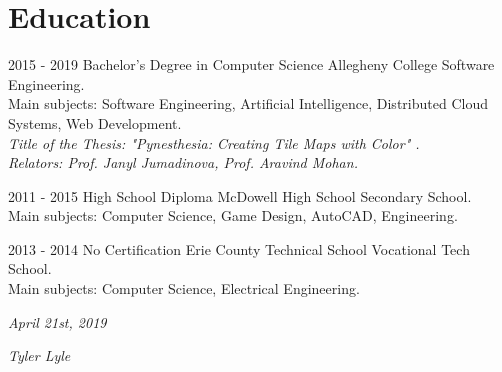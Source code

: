 \documentclass[]{friggeri-cv}
\begin{document}
\section{Education}
\begin{entrylist}
  \entry
    {2015 - 2019}
    {Bachelor's Degree in Computer Science}
    {Allegheny College}
    {Software Engineering.\\
    Main subjects: Software Engineering, Artificial Intelligence, Distributed Cloud Systems, Web Development.\\
    \emph{Title of the Thesis: "Pynesthesia: Creating Tile Maps with Color"      .}\\
    \emph{Relators: Prof. Janyl Jumadinova, Prof. Aravind Mohan.}\\}

  \entry
    {2011 - 2015}
    {High School Diploma}
    {McDowell High School}
    {Secondary School.\\
    Main subjects: Computer Science, Game Design, AutoCAD, Engineering.\\}

  \entry
	{2013 - 2014}
	{No Certification}
	{Erie County Technical School}
	{Vocational Tech School.\\
	Main subjects: Computer Science, Electrical Engineering.\\}
\end{entrylist}

\begin{flushleft}
\emph{April 21st, 2019}
\end{flushleft}
\begin{flushright}
\emph{Tyler Lyle}
\end{flushright}
\end{document}
